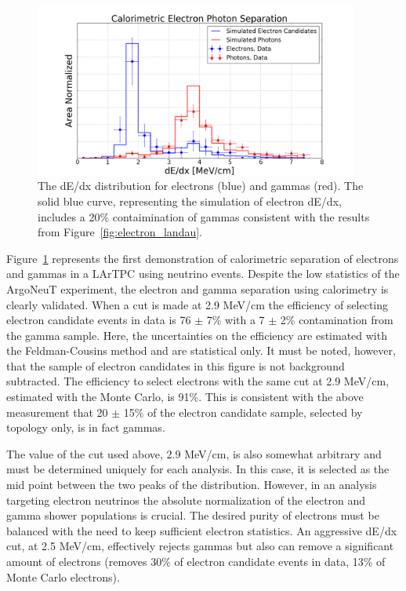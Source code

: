 \begin{figure}[htbp]
  \centering
  \includegraphics[width=0.95\textwidth]{emshower_figures/median_dedx.png}
  \caption[Calorimetric dE/dx Distribution]{The dE/dx distribution for electrons (blue) and gammas (red).  The solid blue curve, representing the simulation of electron dE/dx, includes a 20\% contaimination of gammas consistent with the results from Figure~\ref{fig:electron_landau}.}
  \label{fig:dEdx}
\end{figure}


Figure~\ref{fig:dEdx} represents the first demonstration of calorimetric separation of electrons and gammas in a LArTPC using neutrino events.  Despite the low statistics of the ArgoNeuT experiment, the electron and gamma separation using calorimetry is clearly validated. When a cut is made at 2.9 MeV/cm the efficiency of selecting electron candidate events in data is 76 $\pm$ 7\% with a 7 $\pm$ 2\% contamination from the gamma sample. Here, the uncertainties on the efficiency are estimated with the Feldman-Cousins method \cite{Feldman:1997qc} and are statistical only.  It must be noted, however, that the sample of electron candidates in this figure is not background subtracted.  The efficiency to select electrons with the same cut at 2.9 MeV/cm, estimated with the Monte Carlo, is 91\%.  This is consistent with the above measurement that 20 $\pm$ 15\% of the electron candidate sample, selected by topology only, is in fact gammas.


The value of the cut used above, 2.9 MeV/cm, is also somewhat arbitrary and must be determined uniquely for each analysis.  In this case, it is selected as the mid point between the two peaks of the distribution.  However, in an analysis targeting electron neutrinos the absolute normalization of the electron and gamma shower populations is crucial.  The desired purity of electrons must be balanced with the need to keep sufficient electron statistics.  An aggressive dE/dx cut, at 2.5 MeV/cm, effectively rejects gammas but also can remove a significant amount of electrons (removes 30\% of electron candidate events in data, 13\% of Monte Carlo electrons).  


